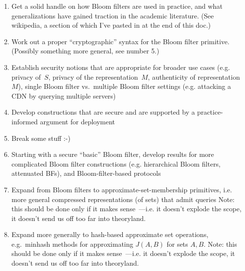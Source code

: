 \begin{enumerate}
\item Get a solid handle on how Bloom filters are used in practice, and what generalizations have gained traction in the academic literature. (See wikipedia, a section of which I've pasted in at the end of this doc.) 
\item Work out a proper “cryptographic” syntax for the Bloom filter primitive.  (Possibly something more general, see number 5.)
\item Establish security notions that are appropriate for broader use cases (e.g. privacy of~$S$, privacy of the representation~$M$, authenticity of representation~$M$), single Bloom filter vs.\ multiple Bloom filter settings (e.g. attacking a CDN by querying multiple servers)
\item Develop constructions that are secure and are supported by a practice-informed argument for deployment
\item Break some stuff :-)
\item Starting with a secure ``basic'' Bloom filter, develop results for more complicated Bloom filter constructions (e.g. hierarchical Bloom filters, attenuated BFs), and Bloom-filter-based protocols
\item Expand from Bloom filters to  approximate-set-membership primitives, i.e. more general compressed representations (of sets) that admit queries  Note: this should be done only if it makes sense~---i.e. it doesn't explode the scope, it doesn't send us off too far into theoryland.
\item Expand more generally to hash-based approximate set operations, e.g.\ minhash methods for approximating $J(A,B)$ for sets $A,B$.  Note: this should be done only if it makes sense~---i.e. it doesn't explode the scope, it doesn't send us off too far into theoryland.
\end{enumerate}

